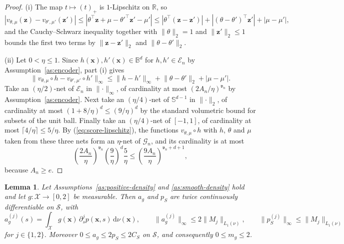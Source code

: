 \documentclass{article} %
\newtheorem{lemma}[theorem]{Lemma}
\begin{document}
\begin{proof}
(i) The map $t\mapsto(t)_+$ is $1$-Lipschitz on $\mathbb{R}$, so
\[
  \left|v_{\theta,\mu}(\mathbf{z})-v_{\theta',\mu'}(\mathbf{z}')\right|
  \le\left|\theta^\top\mathbf{z}+\mu-\theta'^\top\mathbf{z}'-\mu'\right|
  \le\left|\theta^\top(\mathbf{z}-\mathbf{z}')\right|
    +\left|(\theta-\theta')^\top\mathbf{z}'\right|+|\mu-\mu'| ,
\]
and the Cauchy--Schwarz inequality together with $\lVert\theta\rVert_2=1$ and $\lVert\mathbf{z}'\rVert_2\le1$ bounds the first two terms by $\lVert\mathbf{z}-\mathbf{z}'\rVert_2$ and $\lVert\theta-\theta'\rVert_2$.

(ii) Let $0<\eta\le1$.  Since $h(\mathbf{x}),h'(\mathbf{x})\in\mathbb{B}^d$ for $h,h'\in\mathcal{E}_n$ by Assumption~\ref{as:encoder}, part (i) gives
\begin{equation}
  \lVert v_{\theta,\mu}\circ h-v_{\theta',\mu'}\circ h'\rVert_\infty
  \le\lVert h-h'\rVert_\infty+\lVert\theta-\theta'\rVert_2+|\mu-\mu'| .
  \label{eq:score-lipschitz}
\end{equation}
Take an $(\eta/2)$-net of $\mathcal{E}_n$ in $\lVert\cdot\rVert_\infty$, of cardinality at most $(2A_n/\eta)^{\mathfrak{v}_n}$ by Assumption~\ref{as:encoder}.  Next take an $(\eta/4)$-net of $\mathbb{S}^{d-1}$ in $\lVert\cdot\rVert_2$, of cardinality at most $(1+8/\eta)^d\le(9/\eta)^d$ by the standard volumetric bound for subsets of the unit ball.  Finally take an $(\eta/4)$-net of $[-1,1]$, of cardinality at most $\lceil4/\eta\rceil\le5/\eta$.  By (\ref{eq:score-lipschitz}), the functions $v_{\theta,\mu}\circ h$ with $h$, $\theta$ and $\mu$ taken from these three nets form an $\eta$-net of $\mathcal{G}_n$, and its cardinality is at most
\[
  \left(\frac{2A_n}{\eta}\right)^{\mathfrak{v}_n}
  \left(\frac{9}{\eta}\right)^{d}\frac{5}{\eta}
  \le\left(\frac{9A_n}{\eta}\right)^{\mathfrak{v}_n+d+1},
\]
because $A_n\ge e$.
\end{proof}

\begin{lemma}
\label{lem:regularity}
Let Assumptions~\ref{as:positive-density} and \ref{as:smooth-density} hold and let $g:\mathcal{X}\to[0,2]$ be measurable.  Then $a_g$ and $p_S$ are twice continuously differentiable on $\mathcal{S}$, with
\[
  a_g^{(j)}(s)=\int_{\mathcal{X}}g(\mathbf{x})\,\partial_s^{j}p(\mathbf{x},s)\,\mathrm{d}\nu(\mathbf{x}),
  \qquad
  \lVert a_g^{(j)}\rVert_\infty\le2\lVert M_j\rVert_{L_1(\nu)},
  \qquad
  \lVert p_S^{(j)}\rVert_\infty\le\lVert M_j\rVert_{L_1(\nu)}
\]
for $j\in\{1,2\}$.  Moreover $0\le a_g\le2p_S\le2C_S$ on $\mathcal{S}$, and consequently $0\le m_g\le2$.
\end{lemma}
\end{document}
